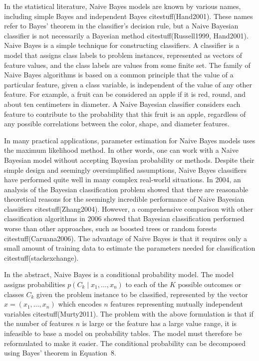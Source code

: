 \documentclass[preprint,12pt]{elsarticle}
\begin{document}
In the statistical literature, Naive Bayes models are known by various names, including simple Bayes and independent Bayes citestuff(Hand2001). These names refer to Bayes' theorem in the classifier's decision rule, but a Naive Bayesian classifier is not necessarily a Bayesian method citestuff(Russell1999, Hand2001). Naive Bayes is a simple technique for constructing classifiers. A classifier is a model that assigns class labels to problem instances, represented as vectors of feature values, and the class labels are values from some finite set. The family of Naive Bayes algorithms is based on a common principle that the value of a particular feature, given a class variable, is independent of the value of any other feature. For example, a fruit can be considered an apple if it is red, round, and about ten centimeters in diameter. A Naive Bayesian classifier considers each feature to contribute to the probability that this fruit is an apple, regardless of any possible correlations between the color, shape, and diameter features.

In many practical applications, parameter estimation for Naive Bayes models uses the maximum likelihood method. In other words, one can work with a Naive Bayesian model without accepting Bayesian probability or methods. Despite their simple design and seemingly oversimplified assumptions, Naive Bayes classifiers have performed quite well in many complex real-world situations. In 2004, an analysis of the Bayesian classification problem showed that there are reasonable theoretical reasons for the seemingly incredible performance of Naive Bayesian classifiers citestuff(Zhang2004). However, a comprehensive comparison with other classification algorithms in 2006 showed that Bayesian classification performed worse than other approaches, such as boosted trees or random forests citestuff(Caruana2006). The advantage of Naive Bayes is that it requires only a small amount of training data to estimate the parameters needed for classification citestuff(stackexchange).

In the abstract, Naive Bayes is a conditional probability model. The model assigns probabilities $p(C_{k}\mid x_{1},\ldots, x_{n})$ to each of the $K$ possible outcomes or classes $C_{k}$ given the problem instance to be classified, represented by the vector $x = (x_{1},\ldots, x_{n})$ which encodes $n$ features representing mutually independent variables citestuff(Murty2011). The problem with the above formulation is that if the number of features $n$ is large or the feature has a large value range, it is infeasible to base a model on probability tables. The model must therefore be reformulated to make it easier. The conditional probability can be decomposed using Bayes' theorem in Equation~8.
\end{document}
